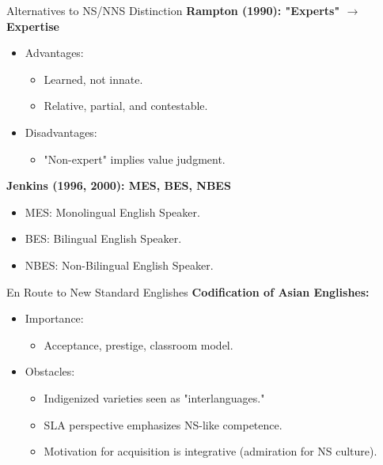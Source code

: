 \documentclass{beamer}
\begin{document}
\begin{frame}{Alternatives to NS/NNS Distinction}
\textbf{Rampton (1990): "Experts" $\rightarrow$ Expertise}
\begin{itemize}
    \item Advantages:
    \begin{itemize}
        \item Learned, not innate.
        \item Relative, partial, and contestable.
    \end{itemize}
    \item Disadvantages:
    \begin{itemize}
        \item "Non-expert" implies value judgment.
    \end{itemize}
\end{itemize}

\textbf{Jenkins (1996, 2000): MES, BES, NBES}
\begin{itemize}
    \item MES: Monolingual English Speaker.
    \item BES: Bilingual English Speaker.
    \item NBES: Non-Bilingual English Speaker.
\end{itemize}
\end{frame}

\begin{frame}{En Route to New Standard Englishes}
\textbf{Codification of Asian Englishes:}
\begin{itemize}
    \item Importance:
    \begin{itemize}
        \item Acceptance, prestige, classroom model.
    \end{itemize}
    \item Obstacles:
    \begin{itemize}
        \item Indigenized varieties seen as "interlanguages."
        \item SLA perspective emphasizes NS-like competence.
        \item Motivation for acquisition is integrative (admiration for NS culture).
    \end{itemize}
\end{itemize}
\end{frame}
\end{document}
